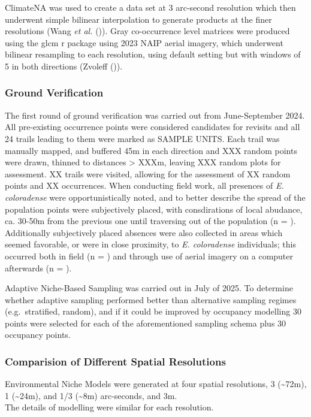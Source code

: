 \documentclass[
]{article}
\begin{document}
ClimateNA was used to create a data set at 3 arc-second resolution which
then underwent simple bilinear interpolation to generate products at the
finer resolutions (Wang \emph{et al.}
()). Gray co-occurrence level
matrices were produced using the glcm r package using 2023 NAIP aerial
imagery, which underwent bilinear resampling to each resolution, using
default setting but with windows of 5 in both directions (Zvoleff
()).

\subsubsection{Ground Verification}\label{ground-verification}

The first round of ground verification was carried out from
June-September 2024. All pre-existing occurrence points were considered
candidates for revisits and all 24 trails leading to them were marked as
SAMPLE UNITS. Each trail was manually mapped, and buffered 45m in each
direction and XXX random points were drawn, thinned to distances
\textgreater{} XXXm, leaving XXX random plots for assessment. XX trails
were visited, allowing for the assessment of XX random points and XX
occurrences. When conducting field work, all presences of \emph{E.
coloradense} were opportunistically noted, and to better describe the
spread of the population points were subjectively placed, with
consdirations of local abudance, ca. 30-50m from the previous one until
traversing out of the population (n = ). Additionally subjectively
placed absences were also collected in areas which seemed favorable, or
were in close proximity, to \emph{E. coloradense} individuals; this
occurred both in field (n = ) and through use of aerial imagery on a
computer afterwards (n = ).

Adaptive Niche-Based Sampling was carried out in July of 2025. To
determine whether adaptive sampling performed better than alternative
sampling regimes (e.g.~stratified, random), and if it could be improved
by occupancy modelling 30 points were selected for each of the
aforementioned sampling schema plus 30 occupancy points.

\subsubsection{Comparision of Different Spatial
Resolutions}\label{comparision-of-different-spatial-resolutions}

Environmental Niche Models were generated at four spatial resolutions, 3
(\textasciitilde72m), 1 (\textasciitilde24m), and 1/3
(\textasciitilde8m) arc-seconds, and 3m.\\
The details of modelling were similar for each resolution.
\end{document}
